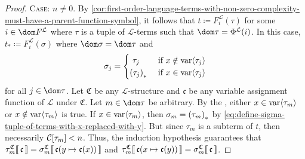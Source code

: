 \begin{proof}
    \vspace{0.3cm}
    \noindent
    {\scshape Case:} \( n \neq 0 \). By \cref{cor:first-order-language-terms-with-non-zero-complexity-must-have-a-parent-function-symbol}, it follows that
    \( t \coloneq F^{\mathcal{L}}_{i}(\tau) \) for some \( i \in \dom F^{\mathcal{L}} \) where \( \tau \) is a tuple of \( \mathcal{L} \)-terms such that 
    \( \dom \tau = \Phi^{\mathcal{L}}(i) \). In this case, \( t_{\ast} \coloneq F^{\mathcal{L}}_{i}(\sigma) \) where \( \dom \sigma = \dom \tau \) and
    \begin{equation}
        \label{eq:define-sigma-tuple-of-terms-with-x-replaced-with-y}
        \sigma_{j} =
        \begin{cases}
            \ \tau_{j} \ &\text{if} \ x \notin \folvars{\tau_{j}}\\
            \mleft( \tau_{j} \mright)_{\ast} \ &\text{if} \  x \in \folvars{\tau_{j}}
        \end{cases}
    \end{equation}
    for all \( j \in \dom \tau \).
    Let \( \mathfrak{C} \) be any \( \mathcal{L} \)-structure and \( \mathfrak{c} \) be any variable assignment function of \( \mathcal{L} \) under \( \mathfrak{C} \).
    Let \( m \in \dom \tau \) be arbitrary.
    By the , either \( x \in \operatorname{var} \langle\tau_{m}\rangle \) or \( x \notin \operatorname{var} \langle\tau_{m}\rangle \) is true.
    If \( x \in \operatorname{var} \langle\tau_{m}\rangle \), then \( \sigma_{m} = \mleft( \tau_{m} \mright)_{\ast} \) by \eqref{eq:define-sigma-tuple-of-terms-with-x-replaced-with-y}.
    But since \( \tau_{m} \) is a subterm of \( t \), then necessarily \( \folcomplexityofterm{\tau_{m}} < n \).
    Thus, the induction hypothesis guarantees that \( \folterminterpretation{\tau_{m}}{\mathfrak{C}}{\mathfrak{c}} =
    \folterminterpretation{\sigma_{m}}{\mathfrak{C}}{ \folmodifiedvariableassignmentfunction{\mathfrak{c}}{y}{\mathfrak{c}(x)} } \)
    and \( \folterminterpretation{\tau_{m}}{\mathfrak{C}}{ \folmodifiedvariableassignmentfunction{\mathfrak{c}}{x}{\mathfrak{c}(y)} } =
    \folterminterpretation{\sigma_{m}}{\mathfrak{C}}{\mathfrak{c}}\).


\end{proof}
